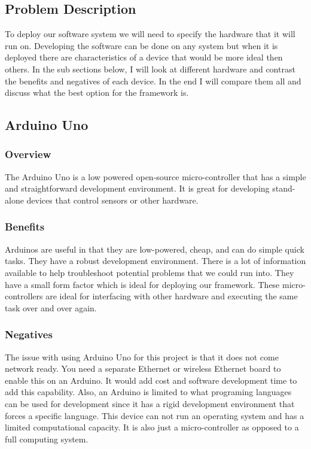 \subsection{Problem Description}
To deploy our software system we will need to specify the hardware that it will run on. Developing the software can be done on any system but when it is deployed there are characteristics of a device that would be more ideal then others.  In the sub sections below, I will look at different hardware and contrast the benefits and negatives of each device. In the end I will compare them all and discuss what the best option for the framework is.

\subsection{Arduino Uno}
\subsubsection{Overview}
The Arduino Uno is a low powered open-source micro-controller that has a simple and straightforward development environment. It is great for developing stand-alone devices that control sensors or other hardware. \cite{ada}
\subsubsection{Benefits}
Arduinos are useful in that they are low-powered, cheap, and can do simple quick tasks. They have a robust development environment. There is a lot of information available to help troubleshoot potential problems that we could run into. They have a small form factor which is ideal for deploying our framework. These micro-controllers are ideal for interfacing with other hardware and executing the same task over and over again.
\subsubsection{Negatives}
The issue with using Arduino Uno for this project is that it does not come network ready. You need a separate Ethernet or wireless Ethernet board to enable this on an Arduino. It would add cost and software development time to add this capability. Also, an Arduino is limited to what programing languages can be used for development since it has a rigid development environment that forces a specific language. This device can not run an operating system and has a limited computational capacity. It is also just a micro-controller as opposed to a full computing system. \cite{ada}

